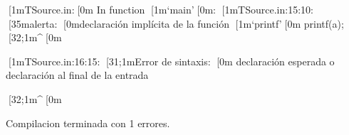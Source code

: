 [1mTSource.in:[0m In function [1m‘main’[0m:
[1mTSource.in:15:10: [35malerta: [0mdeclaración implícita de la función [1m‘printf’[0m 
   printf(a);
        [32;1m^[0m

[1mTSource.in:16:15: [31;1mError de sintaxis: [0m declaración esperada o declaración al final de la entrada

              [32;1m^[0m



Compilacion terminada con 1 errores.
